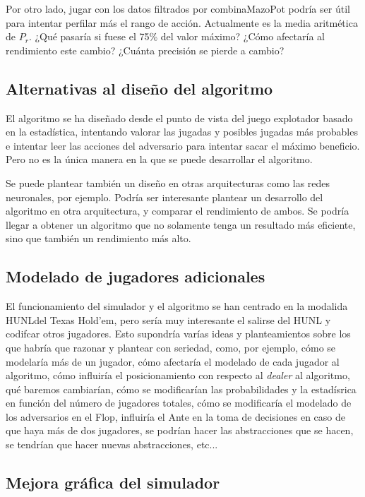 Por otro lado, jugar con los datos filtrados por combinaMazoPot podría ser útil para intentar perfilar más el rango de acción. Actualmente es la media aritmética de $P_r$. ¿Qué pasaría si fuese el 75\% del valor máximo? ¿Cómo afectaría al rendimiento este cambio? ¿Cuánta precisión se pierde a cambio?

\subsection{Alternativas al diseño del algoritmo}

El algoritmo se ha diseñado desde el punto de vista del juego explotador basado en la estadística, intentando valorar las jugadas y posibles jugadas más probables e intentar leer las acciones del adversario para intentar sacar el máximo beneficio. Pero no es la única manera en la que se puede desarrollar el algoritmo.

Se puede plantear también un diseño en otras arquitecturas como las redes neuronales, por ejemplo. Podría ser interesante plantear un desarrollo del algoritmo en otra arquitectura, y comparar el rendimiento de ambos. Se podría llegar a obtener un algoritmo que no solamente tenga un resultado más eficiente, sino que también un rendimiento más alto.

\subsection{Modelado de jugadores adicionales}

El funcionamiento del simulador y el algoritmo se han centrado en la modalida HUNLdel Texas Hold'em, pero sería muy interesante el salirse del HUNL y codifcar otros jugadores. Esto supondría varías ideas y planteamientos sobre los que habría que razonar y plantear con seriedad, como, por ejemplo, cómo se modelaría más de un jugador,  cómo afectaría el modelado de cada jugador al algoritmo, cómo influiría el posicionamiento con respecto al \textit{dealer} al algoritmo, qué baremos cambiarían, cómo se modificarían las probabilidades y la estadísrica en función del número de jugadores totales, cómo se modificaría el modelado de los adversarios en el Flop, influiría el Ante en la toma de decisiones en caso de que haya más de dos jugadores,  se podrían hacer las abstracciones que se hacen, se tendrían que hacer nuevas abstracciones, etc...

\subsection{Mejora gráfica del simulador}

